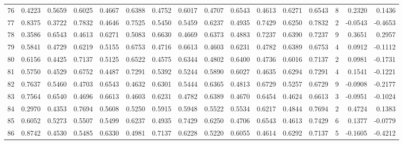 \begin{tabular}{lrrrrrrrrrrrrrrr}
76  &      0.4223 &  0.5659 &  0.6025 &  0.4667 &  0.6388 &  0.4752 &  0.6017 &  0.4707 &  0.6543 &  0.4613 &   0.6271 &     0.6543 &      8 &                    0.2320 &                     0.1436 \\
77  &      0.8375 &  0.3722 &  0.7832 &  0.4646 &  0.7525 &  0.5450 &  0.5459 &  0.6237 &  0.4935 &  0.7429 &   0.6250 &     0.7832 &      2 &                   -0.0543 &                    -0.4653 \\
78  &      0.3586 &  0.6543 &  0.4613 &  0.6271 &  0.5083 &  0.6630 &  0.4669 &  0.6373 &  0.4883 &  0.7237 &   0.6390 &     0.7237 &      9 &                    0.3651 &                     0.2957 \\
79  &      0.5841 &  0.4729 &  0.6219 &  0.5155 &  0.6753 &  0.4716 &  0.6613 &  0.4603 &  0.6231 &  0.4782 &   0.6389 &     0.6753 &      4 &                    0.0912 &                    -0.1112 \\
80  &      0.6156 &  0.4425 &  0.7137 &  0.5125 &  0.6522 &  0.4575 &  0.6344 &  0.4802 &  0.6400 &  0.4736 &   0.6016 &     0.7137 &      2 &                    0.0981 &                    -0.1731 \\
81  &      0.5750 &  0.4529 &  0.6752 &  0.4487 &  0.7291 &  0.5392 &  0.5244 &  0.5890 &  0.6027 &  0.4635 &   0.6294 &     0.7291 &      4 &                    0.1541 &                    -0.1221 \\
82  &      0.7637 &  0.5460 &  0.4703 &  0.6543 &  0.4632 &  0.6301 &  0.5444 &  0.6365 &  0.4813 &  0.6729 &   0.5257 &     0.6729 &      9 &                   -0.0908 &                    -0.2177 \\
83  &      0.7564 &  0.6540 &  0.4696 &  0.6613 &  0.4603 &  0.6231 &  0.4782 &  0.6389 &  0.4670 &  0.6454 &   0.4624 &     0.6613 &      3 &                   -0.0951 &                    -0.1024 \\
84  &      0.2970 &  0.4353 &  0.7694 &  0.5608 &  0.5250 &  0.5915 &  0.5948 &  0.5522 &  0.5534 &  0.6217 &   0.4844 &     0.7694 &      2 &                    0.4724 &                     0.1383 \\
85  &      0.6052 &  0.5273 &  0.5507 &  0.5499 &  0.6237 &  0.4935 &  0.7429 &  0.6250 &  0.4706 &  0.6543 &   0.4613 &     0.7429 &      6 &                    0.1377 &                    -0.0779 \\
86  &      0.8742 &  0.4530 &  0.5485 &  0.6330 &  0.4981 &  0.7137 &  0.6228 &  0.5220 &  0.6055 &  0.4614 &   0.6292 &     0.7137 &      5 &                   -0.1605 &                    -0.4212 \\

\end{tabular}
